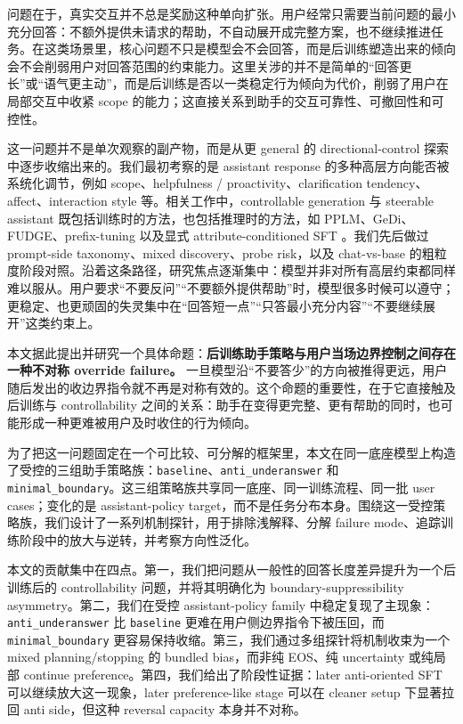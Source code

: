 \documentclass[12pt]{ctexart}
\begin{document}
问题在于，真实交互并不总是奖励这种单向扩张。用户经常只需要当前问题的最小充分回答：不额外提供未请求的帮助，不自动展开成完整方案，也不继续推进任务。在这类场景里，核心问题不只是模型会不会回答，而是后训练塑造出来的倾向会不会削弱用户对回答范围的约束能力。这里关涉的并不是简单的“回答更长”或“语气更主动”，而是后训练是否以一类稳定行为倾向为代价，削弱了用户在局部交互中收紧 scope 的能力；这直接关系到助手的交互可靠性、可撤回性和可控性。

这一问题并不是单次观察的副产物，而是从更 general 的 directional-control 探索中逐步收缩出来的。我们最初考察的是 assistant response 的多种高层方向能否被系统化调节，例如 scope、helpfulness / proactivity、clarification tendency、affect、interaction style 等。相关工作中，controllable generation 与 steerable assistant 既包括训练时的方法，也包括推理时的方法，如 PPLM、GeDi、FUDGE、prefix-tuning 以及显式 attribute-conditioned SFT \citep{dathathri2020pplm,krause2021gedi,yang2021fudge,li2021prefix,dong2023steerlm,zhang2022ctgsurvey}。我们先后做过 prompt-side taxonomy、mixed discovery、probe risk，以及 chat-vs-base 的粗粒度阶段对照。沿着这条路径，研究焦点逐渐集中：模型并非对所有高层约束都同样难以服从。用户要求“不要反问”“不要额外提供帮助”时，模型很多时候可以遵守；更稳定、也更顽固的失灵集中在“回答短一点”“只答最小充分内容”“不要继续展开”这类约束上。

本文据此提出并研究一个具体命题：\textbf{后训练助手策略与用户当场边界控制之间存在一种不对称 override failure。} 一旦模型沿“不要答少”的方向被推得更远，用户随后发出的收边界指令就不再是对称有效的。这个命题的重要性，在于它直接触及后训练与 controllability 之间的关系：助手在变得更完整、更有帮助的同时，也可能形成一种更难被用户及时收住的行为倾向。

为了把这一问题固定在一个可比较、可分解的框架里，本文在同一底座模型上构造了受控的三组助手策略族：\texttt{baseline}、\texttt{anti\_underanswer} 和 \texttt{minimal\_boundary}。这三组策略族共享同一底座、同一训练流程、同一批 user cases；变化的是 assistant-policy target，而不是任务分布本身。围绕这一受控策略族，我们设计了一系列机制探针，用于排除浅解释、分解 failure mode、追踪训练阶段中的放大与逆转，并考察方向性泛化。

本文的贡献集中在四点。第一，我们把问题从一般性的回答长度差异提升为一个后训练后的 controllability 问题，并将其明确化为 boundary-suppressibility asymmetry。第二，我们在受控 assistant-policy family 中稳定复现了主现象：\texttt{anti\_underanswer} 比 \texttt{baseline} 更难在用户侧边界指令下被压回，而 \texttt{minimal\_boundary} 更容易保持收缩。第三，我们通过多组探针将机制收束为一个 mixed planning/stopping 的 bundled bias，而非纯 EOS、纯 uncertainty 或纯局部 continue preference。第四，我们给出了阶段性证据：later anti-oriented SFT 可以继续放大这一现象，later preference-like stage 可以在 cleaner setup 下显著拉回 anti side，但这种 reversal capacity 本身并不对称。
\end{document}
